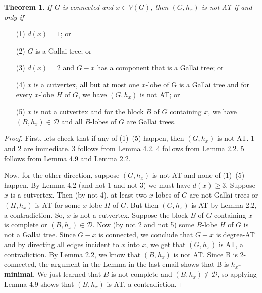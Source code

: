 \documentclass[12pt]{article}
\theoremstyle{plain}
\newtheorem{thm}{Theorem}[section]
\theoremstyle{definition}
\theoremstyle{remark}
\newcommand{\fancy}[1]{\mathcal{#1}}
\newcommand{\D}{\fancy{D}}
\def\D{\fancy{D}}
\begin{document}
\begin{thm}
If $G$ is connected and $x \in V(G)$, then $(G, h_x)$ is not AT if and only if
\end{thm}

\begin{enumerate}
\item[(1)] $d(x) = 1$; or
\item[(2)] $G$ is a Gallai tree; or
\item[(3)] $d(x) = 2$ and $G-x$ has a component that is a Gallai tree; or
\item[(4)] $x$ is a cutvertex, all but at most one $x$-lobe of G is a Gallai
tree and for every $x$-lobe $H$ of $G$, we have $(G, h_x)$ is not AT; or
\item[(5)] $x$ is not a cutvertex and for the block $B$ of $G$ containing $x$,
we have $(B,h_x) \in \D$ and all $B$-lobes of $G$ are Gallai trees.
\end{enumerate}

\begin{proof}
First, lets check that if any of (1)--(5) happen, then $(G, h_x)$ is not AT.  1 and 2
are immediate.  3 follows from Lemma 4.2. 4 follows from Lemma 2.2. 5 follows
from Lemma 4.9 and Lemma 2.2.

Now, for the other direction, suppose $(G, h_x)$ is not AT and none of
(1)--(5) happen.  By Lemma 4.2 (and not 1 and not 3) we must have $d(x) \ge 3$. 
Suppose $x$ is a cutvertex.  Then (by not 4), at least two $x$-lobes of $G$ are
not Gallai trees or $(H, h_x)$ is AT for some $x$-lobe $H$ of $G$.  But then
$(G,h_x)$ is AT by Lemma 2.2, a contradiction.  So, $x$ is not a cutvertex. 
Suppose the block $B$ of $G$ containing $x$ is complete or $(B,h_x) \in \D$. 
Now (by not 2 and not 5) some $B$-lobe $H$ of $G$ is not a Gallai tree.  Since
$G-x$ is connected, we conclude that $G-x$ is degree-AT and by directing all
edges incident to $x$ into $x$, we get that $(G,h_x)$ is AT, a contradiction. 
By Lemma 2.2, we know that $(B, h_x)$ is not AT. Since B is 2-connected, the
argument in the Lemma in the last email
shows that B is \textbf{$h_x$-minimal}.  We just learned that $B$ is not
complete and $(B,h_x) \not \in \D$, so applying Lemma 4.9 shows that $(B, h_x)$
is AT, a contradiction.
\end{proof}
\end{document}
